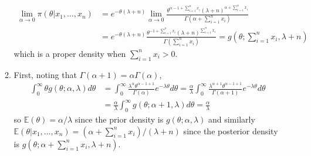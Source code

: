 \documentclass[12pt]{article}
\newcommand{\E}{\mathbb{E}}
\begin{document}
\begin{enumerate}
\begin{enumerate}
\begin{align*}
            \lim \limits_{\alpha \to 0} \pi(\theta|x_1,\ldots,x_n) &= e^{-\theta(\lambda+n)} \lim \limits_{\alpha \to 0} \frac{\theta^{\alpha-1+\sum_{i=1}^n x_i} (\lambda+n)^{\alpha+\sum_{i=1}^n x_i}}{\Gamma(\alpha + \sum_{i=1}^n x_i)}\\
            &= e^{-\theta(\lambda+n)} \frac{\theta^{-1+\sum_{i=1}^n x_i} (\lambda+n)^{\sum_{i=1}^n x_i}}{\Gamma(\sum_{i=1}^n x_i)} = g(\theta; \sum_{i=1}^n x_i, \lambda+n)
        \end{align*} which is a proper density when $\sum_{i=1}^n x_i > 0$.
        \item First, noting that $\Gamma(\alpha+1) = \alpha \Gamma(\alpha)$, \begin{align*}
            \int_0^\infty \theta g(\theta;\alpha,\lambda) d\theta &= \int_0^\infty \frac{\lambda^\alpha \theta^{\alpha-1+1}}{\Gamma(\alpha)} e^{-\lambda \theta} d\theta = \frac{\alpha}{\lambda} \int_0^\infty \frac{\lambda^{\alpha+1} \theta^{\alpha-1+1}}{\Gamma(\alpha+1)} e^{-\lambda \theta} d\theta\\
            &= \frac{\alpha}{\lambda} \int_0^\infty g(\theta; \alpha+1,\lambda) d\theta = \frac{\alpha}{\lambda}
        \end{align*} so $\E(\theta) = \alpha/\lambda$ since the prior density is $g(\theta;\alpha,\lambda)$ and similarly $\E(\theta|x_1,\ldots,x_n) = (\alpha+\sum_{i=1}^n x_i)/(\lambda+n)$ since the posterior density is $g(\theta;\alpha+\sum_{i=1}^n x_i,\lambda+n)$.
    \end{enumerate}
\end{enumerate}
\end{document}
